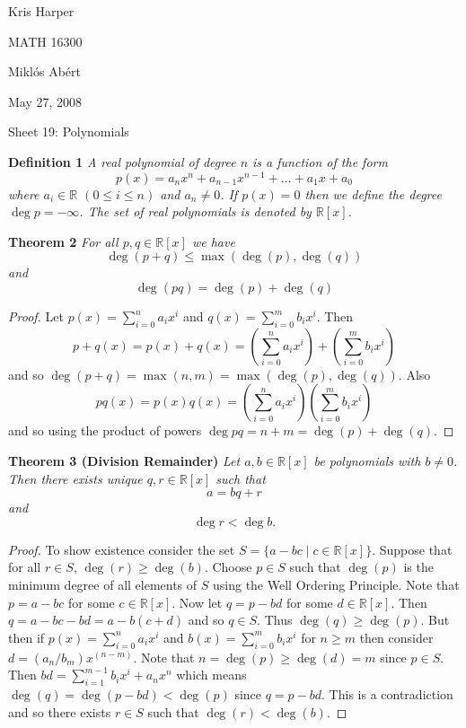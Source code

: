 \documentclass{article}
\begin{document}
\newpage

\begin{flushright}
Kris Harper

MATH 16300

Mikl\'{o}s Ab\'{e}rt

May 27, 2008
\end{flushright}

\begin{flushleft}

\Large

Sheet 19: Polynomials\newline

\normalsize

\textbf{Definition 1}
\textsl{A real polynomial of degree $n$ is a function of the form
\[
p(x) = a_n x^n + a_{n-1} x^{n-1} + \dots + a_1 x + a_0
\]
where $a_i \in \mathbb{R}$ $(0 \leq i \leq n)$ and $a_n \neq 0$. If $p(x) = 0$ then we define the degree $\deg p = - \infty$. The set of real polynomials is denoted by $\mathbb{R}[x]$.}\newline

\textbf{Theorem 2}
\textsl{For all $p,q \in \mathbb{R}[x]$ we have
\[
\deg(p+q) \leq \max(\deg(p), \deg(q))
\]
and
\[
\deg(pq) = \deg(p) + \deg(q)
\]}
\begin{proof}
Let $p(x) = \sum_{i=0}^n a_i x^i$ and $q(x) = \sum_{i=0}^m b_i x^i$. Then
\[
p+q(x) = p(x) + q(x) = \left ( \sum_{i=0}^n a_i x^i \right ) + \left ( \sum_{i=0}^m b_i x^i \right )
\]
and so $\deg(p+q) = \max(n,m) = \max(\deg(p), \deg(q))$. Also
\[
pq(x) = p(x)q(x) = \left ( \sum_{i=0}^n a_i x^i \right ) \left ( \sum_{i=0}^m b_i x^i \right )
\]
and so using the product of powers $\deg pq = n+m = \deg(p) + \deg(q)$.
\end{proof}

\textbf{Theorem 3 (Division Remainder)}
\textsl{Let $a,b \in \mathbb{R}[x]$ be polynomials with $b \neq 0$. Then there exists unique $q,r \in \mathbb{R}[x]$ such that
\[
a = bq + r
\]
and
\[
\deg r < \deg b.
\]}
\begin{proof}
To show existence consider the set $S = \{a-bc \mid c \in \mathbb{R}[x]\}$. Suppose that for all $r \in S$, $\deg(r) \geq \deg(b)$. Choose $p \in S$ such that $\deg(p)$ is the minimum degree of all elements of $S$ using the Well Ordering Principle. Note that $p=a-bc$ for some $c \in \mathbb{R}[x]$. Now let $q = p-bd$ for some $d \in \mathbb{R}[x]$. Then $q = a-bc-bd=a-b(c+d)$ and so $q \in S$. Thus $\deg(q) \geq \deg(p)$. But then if $p(x) = \sum_{i=0}^n a_i x^i$ and $b(x) = \sum_{i=0}^m b_i x^i$ for $n \geq m$ then consider $d = (a_n/b_m) x^{(n-m)}$. Note that $n = \deg(p) \geq \deg(d) = m$ since $p \in S$. Then $bd = \sum_{i=1}^{m-1} b_i x^i + a_n x^n$ which means $\deg(q) = \deg(p-bd) < \deg(p)$ since $q = p-bd$. This is a contradiction and so there exists $r \in S$ such that $\deg(r) < \deg(b)$.\newline


\end{proof}
\end{flushleft}
\end{document}

